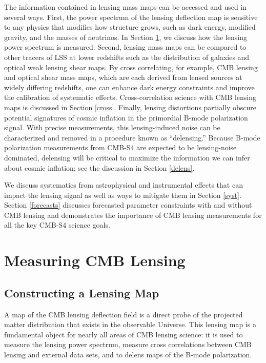 The information contained in lensing mass maps can be accessed and used in several ways.
First, the power spectrum of the lensing deflection map is sensitive to any physics that modifies how structure grows, such as dark energy, modified gravity, and the masses of neutrinos.
In Section \ref{measuringLensing}, we discuss how the lensing power spectrum is measured.
Second, lensing mass maps can be compared to other tracers of LSS at lower redshifts such as the distribution of galaxies and optical weak lensing shear maps.  By cross correlating, for example, CMB lensing and optical shear mass maps, which are each derived from lensed sources at widely differing redshifts, one can enhance dark energy constraints and improve the calibration of systematic effects.
Cross-correlation science with CMB lensing maps is discussed in Section \ref{cross}.
Finally, lensing distortions partially obscure potential signatures of cosmic inflation in the primordial B-mode polarization signal.
With precise measurements, this lensing-induced noise can be characterized and removed in a procedure known as ``delensing.''
Because B-mode polarization measurements from CMB-S4 are expected to be lensing-noise dominated, delensing will be critical to maximize the information we can infer about cosmic inflation; see the discussion in Section \ref{delens}.

We discuss systematics from astrophysical and instrumental effects that can impact the lensing signal as well as ways to mitigate them in Section \ref{syst}.  Section \ref{forecasts} discusses forecasted parameter constraints with and without CMB lensing and demonstrates the importance of CMB lensing measurements for all the key CMB-S4 science goals.  


\section{Measuring CMB Lensing}\label{measuringLensing}

\subsection{Constructing a Lensing Map}\label{kappaMap}

A map of the CMB lensing deflection field is a direct probe of the projected matter distribution that exists in the observable Universe. This lensing map is a fundamental object for nearly all areas of CMB lensing science: it is used to measure the lensing power spectrum, measure cross correlations between CMB lensing and external data sets, and to delens maps of the B-mode polarization.  

